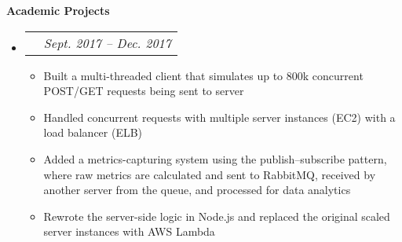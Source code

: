 \documentclass{article}
\makeatletter
\newcommand{\resitem}[1]{
    \item #1
    \vspace{-2pt}
}
\newcommand{\resheading}[1]{{\large \colorbox{mygrey}{\begin{minipage}{\textwidth}{\textbf{#1 \vphantom{p\^{E}}}}\end{minipage}}}}
\newcommand{\ressubheadingproj}[2]{
\begin{tabular*}{6.80in}{l@{\extracolsep{\fill}}r}
    \textbf{#1} & \textit{#2} \\
\end{tabular*}\vspace{-6pt}}
\makeatother
\begin{document}
\begin{itemize}
    \end{itemize}


    \resheading{Academic Projects}

    \begin{itemize}
        \item\ressubheadingproj
        {\href
        {https://github.com/jeremylinlin/cs6650-scalable-distributed-systems}
        {Distributed Ski Data Processing Engine}
        }
        {Sept. 2017 -- Dec. 2017}
        {\footnotesize
        \begin{itemize}
            \resitem
            {Built a multi-threaded client that simulates up to 800k concurrent POST/GET
            requests being sent to server}
            \resitem
            {Handled concurrent requests with multiple server instances (EC2)
            with a load balancer (ELB)}
            \resitem
            {Added a metrics-capturing system using the publish--subscribe pattern, where
            raw metrics are calculated and sent to RabbitMQ, received by another server
            from the queue, and processed for data analytics}
            \resitem
            {Rewrote the server-side logic in Node.js and replaced the original scaled server
            instances with AWS Lambda}

        \end{itemize}
        }
    \end{itemize}
\end{document}
